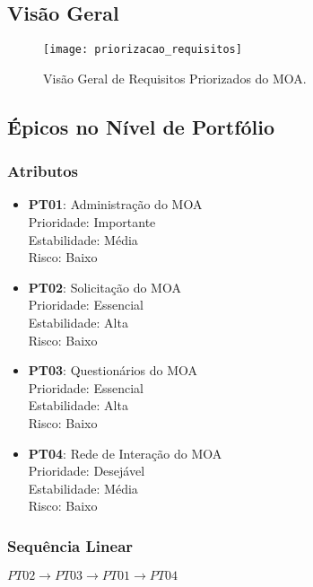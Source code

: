 \subsection[Visão Geral]{Visão Geral}
\label{subsec:requisitos_priorizacao_geral}
	\begin{figure}[H]
		\centering
		\texttt{[image: priorizacao\_requisitos]}
		\caption[Visão Geral de Requisitos Priorizados do MOA]{Visão Geral de Requisitos Priorizados do MOA.}
		\label{fig:visaogeralpriorizado}
	\end{figure}

\subsection[Épicos no Nível de Portfólio]{Épicos no Nível de Portfólio}
\label{subsec:requisitos_priorizacao_portfolio}
	\subsubsection[Atributos]{Atributos}
	\label{subsubsec:requisitos_priorizacao_portfolio_atributos}
		\begin{itemize}
			\item{\textbf{PT01}: Administração do MOA
			\\ Prioridade: Importante
			\\ Estabilidade: Média
			\\ Risco: Baixo}
			\item{\textbf{PT02}: Solicitação do MOA
			\\ Prioridade: Essencial
			\\ Estabilidade: Alta
			\\ Risco: Baixo}
			\item{\textbf{PT03}: Questionários do MOA
			\\ Prioridade: Essencial
			\\ Estabilidade: Alta
			\\ Risco: Baixo}
			\item{\textbf{PT04}: Rede de Interação do MOA
			\\ Prioridade: Desejável
			\\ Estabilidade: Média
			\\ Risco: Baixo}
		\end{itemize}

	\subsubsection[Sequência Linear]{Sequência Linear}
	\label{subsubsec:requisitos_priorizacao_portfolio_sequencia}
		\begin{center}
		$PT02 \rightarrow PT03 \rightarrow PT01 \rightarrow PT04$
		\end{center}

